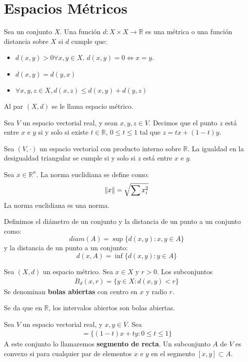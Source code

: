 \documentclass{./Topologia.tex}
\begin{document}
\chapter{Espacios Métricos}
\begin{defin}
Sea un conjunto $X$. Una función $d: X \times X \to \mathbb{R}$ es una métrica o una función distancia sobre $X$ si $d$ cumple que:
\begin{itemize}
	\item $d(x,y) > 0 \forall x,y \in X$. $d(x,y)=0 \iff x=y$.
	\item $d(x,y) = d(y,x)$
	\item $\forall x,y,z \in X, d(x,z) \leq d(x,y) + d(y,z)$ 
\end{itemize}
Al par $(X,d)$ se le llama espacio métrico. 
\end{defin}
\begin{defin} 
	Sea $V$ un espacio vectorial real, y sean $x, y, z \in V$. Decimos que el punto $z$ está entre $x$ e $y$ si y solo si existe $t \in \mathbb{R}$, $0 \leq t \leq 1$ tal que $z = tx +(1-t)y$.     

\end{defin}
\begin{prop}
Sea $(V, \cdot )$ un espacio vectorial con producto interno sobre $\mathbb{R}$. La igualdad en la desigualdad triangular se cumple si y solo si $z$ está entre $x$ e $y$.     
\end{prop}
\begin{prop}
	Sea $x \in \mathbb{R}^{n}$. La norma euclidiana se define como:
	\[
		\norm{x} = \sqrt{\sum x_{i}^{2}}
	\]
	La norma euclidiana es una norma.
\end{prop}
\begin{defin}
Definimos el diámetro de un conjunto y la distancia de un punto a un conjunto como:
\[
	diam(A) = \sup \{ d(x,y): x,y \in A \}
\]
y la distancia de un punto a un conjunto:
\[
	d(x,A) = \inf \{ d(x,y) : y \in A \}
\]
\end{defin}
\begin{defin}
	Sea $(X,d)$ un espacio métrico. Sea $x \in X$ y $r > 0$. Los subconjuntos
	\begin{align}
		B_{d}(x,r) = \{ y \in X : d(x,y) < r \}
	\end{align}
	Se denominan \textbf{bolas abiertas} con centro en $x$ y radio $r$.
\end{defin}
Se da que en $\mathbb{R}$, los intervalos abiertos son bolas abiertas.
\begin{defin}
	Sea $V$ un espacio vectorial real, y $x,y \in  V$. Sea
	\begin{align}
		[x,y] = \{ (1-t)x+ty: 0 \leq t \leq 1 \}
	\end{align}
	A este conjunto lo llamaremos \textbf{segmento de recta}. Un subconjunto
	$A$ de $V$ es convexo si para cualquier par de elementos $x$ e $y$ en
	el segmento $[x,y] \subset A$.
\end{defin}
\end{document}
